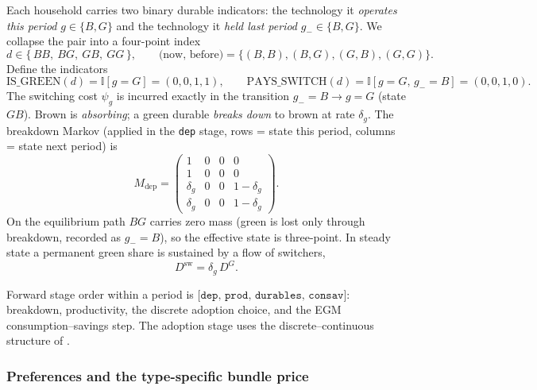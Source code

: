 \documentclass[11pt,a4paper]{article}
\newcommand{\I}{\mathbb{I}}
\newcommand{\dsw}{D^{\mathrm{sw}}}
\newcommand{\DG}{D^{G}}
\begin{document}
Each household carries two binary durable indicators: the technology it
\emph{operates this period} $g\in\{B,G\}$ and the technology it \emph{held last
period} $g_-\in\{B,G\}$. We collapse the pair into a four-point index
\begin{equation}
d\in\{\,BB,\ BG,\ GB,\ GG\,\},\qquad
\text{(now, before)}=\{(B,B),(B,G),(G,B),(G,G)\}.
\end{equation}
Define the indicators
\begin{equation}
\mathrm{IS\_GREEN}(d)=\I[g=G]=(0,0,1,1),\qquad
\mathrm{PAYS\_SWITCH}(d)=\I[g=G,\,g_-=B]=(0,0,1,0).
\end{equation}
The switching cost $\psi_g$ is incurred exactly in the transition $g_-=B\to g=G$
(state $GB$). Brown is \emph{absorbing}; a green durable \emph{breaks down} to
brown at rate $\delta_g$. The breakdown Markov (applied in the \texttt{dep}
stage, rows = state this period, columns = state next period) is
\begin{equation}
M_{\mathrm{dep}}=
\begin{pmatrix}
1 & 0 & 0 & 0\\
1 & 0 & 0 & 0\\
\delta_g & 0 & 0 & 1-\delta_g\\
\delta_g & 0 & 0 & 1-\delta_g
\end{pmatrix}.
\end{equation}
On the equilibrium path $BG$ carries zero mass (green is lost only through
breakdown, recorded as $g_-=B$), so the effective state is three-point. In
steady state a permanent green share is sustained by a flow of switchers,
\begin{equation}
\dsw=\delta_g\,\DG. \label{eq:stockflow}
\end{equation}

Forward stage order within a period is
$\texttt{[dep, prod, durables, consav]}$: breakdown, productivity, the discrete
adoption choice, and the EGM consumption--savings step. The adoption stage uses
the discrete--continuous structure of \cite{DCEGM2017}.

\subsubsection{Preferences and the type-specific bundle price}
\end{document}
